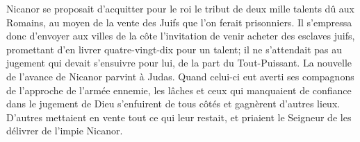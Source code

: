 Nicanor se proposait d’acquitter pour le roi
		le tribut de deux mille talents dû aux Romains,
	au moyen de la vente des Juifs que l’on ferait prisonniers.
Il s’empressa donc d’envoyer aux villes de la côte
		l’invitation de venir acheter des esclaves juifs,
	promettant d’en livrer quatre-vingt-dix pour un talent;
	il ne s’attendait pas au jugement qui devait s’ensuivre pour lui,
		de la part du Tout-Puissant.
La nouvelle de l’avance de Nicanor parvint à Judas.
Quand celui-ci eut averti ses compagnons de l’approche de l’armée ennemie,
	les lâches et ceux qui manquaient de confiance dans le jugement de Dieu
	s’enfuirent de tous côtés et gagnèrent d’autres lieux.
D’autres mettaient en vente tout ce qui leur restait,
	et priaient le Seigneur de les délivrer de l’impie Nicanor.
